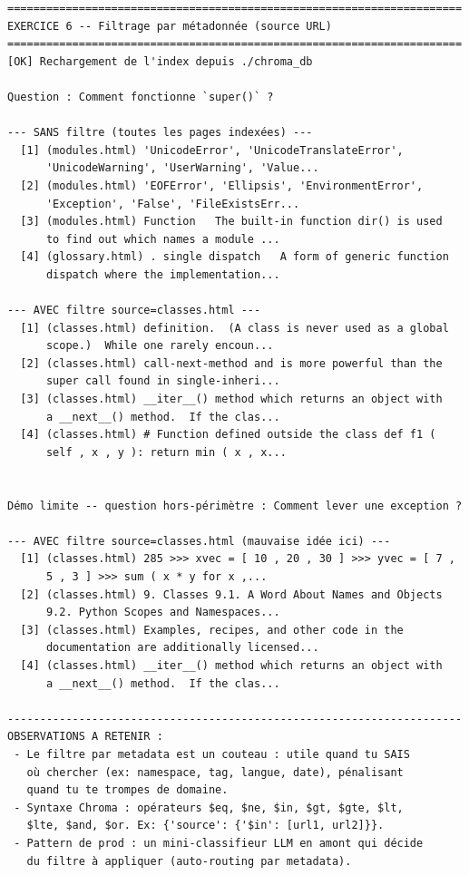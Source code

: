 \documentclass[11pt,a4paper]{article}
\begin{document}
\begin{tcolorbox}[
  colback=white,
  colframe=black!50,
  coltitle=black,
  fonttitle=\footnotesize\bfseries,
  fontupper=\footnotesize,
  title=Sortie de l'exécution,
  breakable,
]
\begin{verbatim}
======================================================================
EXERCICE 6 -- Filtrage par métadonnée (source URL)
======================================================================
[OK] Rechargement de l'index depuis ./chroma_db

Question : Comment fonctionne `super()` ?

--- SANS filtre (toutes les pages indexées) ---
  [1] (modules.html) 'UnicodeError', 'UnicodeTranslateError',
      'UnicodeWarning', 'UserWarning', 'Value...
  [2] (modules.html) 'EOFError', 'Ellipsis', 'EnvironmentError',
      'Exception', 'False', 'FileExistsErr...
  [3] (modules.html) Function   The built-in function dir() is used
      to find out which names a module ...
  [4] (glossary.html) . single dispatch   A form of generic function
      dispatch where the implementation...

--- AVEC filtre source=classes.html ---
  [1] (classes.html) definition.  (A class is never used as a global
      scope.)  While one rarely encoun...
  [2] (classes.html) call-next-method and is more powerful than the
      super call found in single-inheri...
  [3] (classes.html) __iter__() method which returns an object with
      a __next__() method.  If the clas...
  [4] (classes.html) # Function defined outside the class def f1 (
      self , x , y ): return min ( x , x...


Démo limite -- question hors-périmètre : Comment lever une exception ?

--- AVEC filtre source=classes.html (mauvaise idée ici) ---
  [1] (classes.html) 285 >>> xvec = [ 10 , 20 , 30 ] >>> yvec = [ 7 ,
      5 , 3 ] >>> sum ( x * y for x ,...
  [2] (classes.html) 9. Classes 9.1. A Word About Names and Objects
      9.2. Python Scopes and Namespaces...
  [3] (classes.html) Examples, recipes, and other code in the
      documentation are additionally licensed...
  [4] (classes.html) __iter__() method which returns an object with
      a __next__() method.  If the clas...

----------------------------------------------------------------------
OBSERVATIONS A RETENIR :
 - Le filtre par metadata est un couteau : utile quand tu SAIS
   où chercher (ex: namespace, tag, langue, date), pénalisant
   quand tu te trompes de domaine.
 - Syntaxe Chroma : opérateurs $eq, $ne, $in, $gt, $gte, $lt,
   $lte, $and, $or. Ex: {'source': {'$in': [url1, url2]}}.
 - Pattern de prod : un mini-classifieur LLM en amont qui décide
   du filtre à appliquer (auto-routing par metadata).
\end{verbatim}
\end{tcolorbox}
\end{document}
